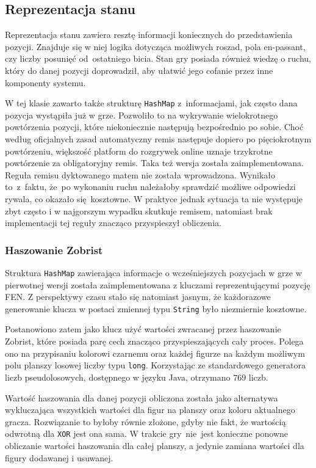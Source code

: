 \subsection{Reprezentacja stanu}
\label{subsec:reprezentacja-stanu}

Reprezentacja stanu zawiera resztę informacji koniecznych do przedstawienia pozycji.
Znajduje się w niej logika dotycząca możliwych roszad, pola en-passant, czy liczby posunięć od~ostatniego bicia.
Stan gry posiada również wiedzę o ruchu, który do danej pozycji doprowadził, aby ułatwić jego cofanie przez inne komponenty systemu.

W tej klasie zawarto także strukturę \texttt{HashMap} z~informacjami, jak często dana pozycja wystąpiła już w grze.
Pozwoliło to na wykrywanie wielokrotnego powtórzenia pozycji, które niekoniecznie następują bezpośrednio po sobie.
Choć według oficjalnych zasad automatyczny remis następuje dopiero po pięciokrotnym powtórzeniu, większość platform do rozgrywek online uznaje trzykrotne powtórzenie za obligatoryjny remis.
Taka też wersja została zaimplementowana.
Reguła remisu dyktowanego matem nie została wprowadzona.
Wynikało to~z~faktu, że~po wykonaniu ruchu należałoby sprawdzić możliwe odpowiedzi rywala, co okazało się~kosztowne.
W praktyce jednak sytuacja ta nie występuje zbyt często i w najgorszym wypadku skutkuje remisem, natomiast brak implementacji tej reguły znacząco przyspieszył obliczenia.

\subsubsection{Haszowanie Zobrist}
Struktura \texttt{HashMap} zawierająca informacje o wcześniejszych pozycjach w grze w pierwotnej wersji została zaimplementowana z kluczami reprezentującymi pozycję FEN.
Z perspektywy czasu stało się natomiast jasnym, że każdorazowe generowanie klucza w postaci zmiennej typu \texttt{String} było niezmiernie kosztowne.

Postanowiono zatem jako klucz użyć wartości zwracanej przez haszowanie Zobrist, które posiada parę cech znacząco przyspieszających cały proces.
Polega ono na przypisaniu kolorowi czarnemu oraz każdej figurze na każdym możliwym polu planszy losowej liczby typu \texttt{long}.
Korzystając ze standardowego generatora liczb pseudolosowych, dostępnego w języku Java, otrzymano $769$ liczb.

Wartość haszowania dla danej pozycji obliczona została jako alternatywa wykluczająca wszystkich wartości dla figur na planszy oraz koloru aktualnego gracza.
Rozwiązanie to byłoby równie złożone, gdyby nie fakt, że wartością odwrotną dla \texttt{XOR} jest ona sama.
W trakcie gry~nie~jest konieczne ponowne obliczanie wartości haszowania dla całej planszy, a jedynie zamiana wartości dla figury dodawanej i usuwanej.


